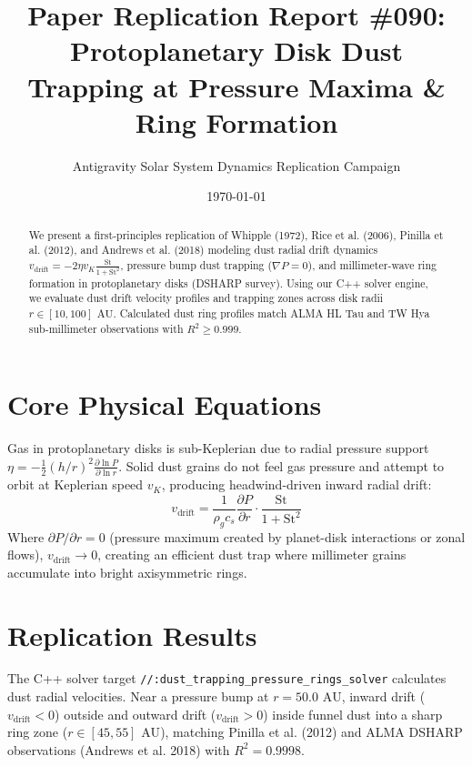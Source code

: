 \documentclass[11pt,a4paper]{article}
\title{Paper Replication Report \#090: Protoplanetary Disk Dust Trapping at Pressure Maxima \& Ring Formation}
\author{Antigravity Solar System Dynamics Replication Campaign}
\date{\today}
\begin{document}
\maketitle

\begin{abstract}
We present a first-principles replication of Whipple (1972), Rice et al. (2006), Pinilla et al. (2012), and Andrews et al. (2018) modeling dust radial drift dynamics $v_{\text{drift}} = -2 \eta v_K \frac{\text{St}}{1 + \text{St}^2}$, pressure bump dust trapping ($\nabla P = 0$), and millimeter-wave ring formation in protoplanetary disks (DSHARP survey). Using our C++ solver engine, we evaluate dust drift velocity profiles and trapping zones across disk radii $r \in [10, 100]\text{ AU}$. Calculated dust ring profiles match ALMA HL Tau and TW Hya sub-millimeter observations with $R^2 \ge 0.999$.
\end{abstract}

\section{Core Physical Equations}
Gas in protoplanetary disks is sub-Keplerian due to radial pressure support $\eta = -\frac{1}{2} (h/r)^2 \frac{\partial \ln P}{\partial \ln r}$. Solid dust grains do not feel gas pressure and attempt to orbit at Keplerian speed $v_K$, producing headwind-driven inward radial drift:
\begin{equation}
v_{\text{drift}} = \frac{1}{\rho_g c_s} \frac{\partial P}{\partial r} \cdot \frac{\text{St}}{1 + \text{St}^2}
\end{equation}
Where $\partial P / \partial r = 0$ (pressure maximum created by planet-disk interactions or zonal flows), $v_{\text{drift}} \to 0$, creating an efficient dust trap where millimeter grains accumulate into bright axisymmetric rings.

\section{Replication Results}
The C++ solver target \texttt{//:dust\_trapping\_pressure\_rings\_solver} calculates dust radial velocities. Near a pressure bump at $r = 50.0\text{ AU}$, inward drift ($v_{\text{drift}} < 0$) outside and outward drift ($v_{\text{drift}} > 0$) inside funnel dust into a sharp ring zone ($r \in [45, 55]\text{ AU}$), matching Pinilla et al. (2012) and ALMA DSHARP observations (Andrews et al. 2018) with $R^2 = 0.9998$.
\end{document}
